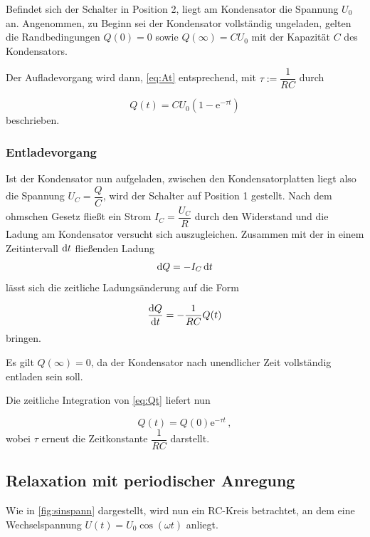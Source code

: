 Befindet sich der Schalter in Position 2, liegt am Kondensator die Spannung $U_0$ an.
Angenommen, zu Beginn sei der Kondensator vollständig ungeladen, gelten die Randbedingungen $Q(0) = 0$ sowie $Q(\infty) = C U_0$ mit der Kapazität $C$ des Kondensators.

Der Aufladevorgang wird dann, \eqref{eq:At} entsprechend, mit $τ := \dfrac{1}{RC}$ durch

\begin{equation*}
    Q(t) = C U_0 (1 - \text{e}^{-τ t})
    \label{eq:aufladung}
\end{equation*} beschrieben.


\subsubsection{Entladevorgang}

Ist der Kondensator nun aufgeladen, zwischen den Kondensatorplatten liegt also die Spannung $U_C = \dfrac{Q}{C}$, wird der Schalter auf Position 1 gestellt.
Nach dem ohmschen Gesetz fließt ein Strom $I_C = \dfrac{U_C}{R}$ durch den Widerstand und die Ladung am Kondensator versucht sich auszugleichen.
Zusammen mit der in einem Zeitintervall $\mathrm{d} t$ fließenden Ladung
\begin{equation}
    \mathrm{d} Q = -I_C \,\mathrm{d} t
    \label{eq:difQ}
\end{equation} lässt sich die zeitliche Ladungsänderung auf die Form

\begin{equation}
    \frac{\mathrm{d} Q}{\mathrm{d} t} = -\frac{1}{RC} Q(t)
    \label{eq:Qt}
\end{equation} bringen.

Es gilt $Q(\infty) = 0$, da der Kondensator nach unendlicher Zeit vollständig entladen sein soll.

Die zeitliche Integration von \eqref{eq:Qt} liefert nun

\begin{equation*}
    Q(t) = Q(0) \text{e}^{-τ t}\,,
\end{equation*} wobei $τ$ erneut die Zeitkonstante $\dfrac{1}{RC}$ darstellt.


\subsection{Relaxation mit periodischer Anregung}

Wie in \autoref{fig:sinspann} dargestellt, wird nun ein RC-Kreis betrachtet, an dem eine Wechselspannung $U(t) = U_0 \cos(ω t)$ anliegt.

